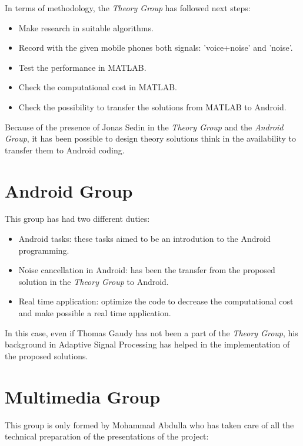 \documentclass[11pt,a4paper,english]{book}  %
\theoremstyle{definition}  %
\theoremstyle{plain}  %
\theoremstyle{remark}  %
\begin{document}
In terms of methodology, the \textit{Theory Group} has followed next steps:

\begin{itemize}
\item Make research in suitable algorithms.
\item Record with the given mobile phones both signals: 'voice+noise' and 'noise'. 
\item Test the performance in MATLAB.
\item Check the computational cost in MATLAB.
\item Check the possibility to transfer the solutions from MATLAB to Android.
\end{itemize}

Because of the presence of Jonas Sedin in the \textit{Theory Group} and the \textit{Android Group}, it has been possible to design theory solutions think in the availability to transfer them to Android coding.\\



	\section{Android Group}
	
	This group has had two different duties:
	
	\begin{itemize}
	\item Android tasks: these tasks aimed to be an introdution to the Android programming.
	\item Noise cancellation in Android: has been the transfer from the proposed solution in the \textit{Theory Group} to Android.
	\item Real time application: optimize the code to decrease the computational cost and make possible a real time application.
	\end{itemize}
	
	In this case, even if Thomas Gaudy has not been a part of the \textit{Theory Group}, his background in Adaptive Signal Processing has helped in the implementation of the proposed solutions.
	
	\section{Multimedia Group}

This group is only formed by Mohammad Abdulla who has taken care of all the technical preparation of the presentations of the project:
\end{document}

